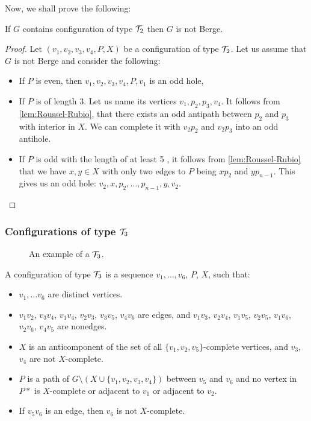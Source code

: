 Now, we shall prove the following:

\begin{theorem}
	If $G$ contains configuration of type $\mathcal{T}_2$ then $G$ is not Berge.
\end{theorem}
\begin{proof}
	Let $(v_1, v_2, v_3, v_4, P, X)$ be a configuration of type $\mathcal{T}_2$. Let us assume that $G$ is not Berge and consider the following:
	\begin{itemize}
		\item If $P$ is even, then $v_1, v_2, v_3, v_4, P, v_1$ is an odd hole,
		\item If $P$ is of length 3.  Let us name its vertices $v_1, p_2, p_3, v_4$. It follows from \cref{lem:Roussel-Rubio}, that there exists an odd antipath between $p_2$ and $p_3$ with interior in $X$. We can complete it with $v_2p_2$ and $v_2p_3$ into an odd antihole.
		\item If $P$ is odd with the length of at least 5 , it follows from \cref{lem:Roussel-Rubio} that we have $x, y \in X$ with only two edges to $P$ being $xp_2$ and $yp_{n-1}$. This gives us an odd hole: $v_2, x, p_2, \ldots, p_{n-1}, y, v_2$.
	\end{itemize}
\end{proof}

\subsubsection{Configurations of type $\mathcal{T}_3$}

\begin{wrapfigure}{r}{0.35\textwidth}
	
	\caption{An example of a $\mathcal{T}_3$.}%
	\vspace{-1.5cm}
\end{wrapfigure}

A configuration of type $\mathcal{T}_3$ is a sequence $v_1, \ldots, v_6$, $P$, $X$, such that:
\begin{itemize}
	\item $v_1, \ldots v_6$ are distinct vertices.
	\item $v_1v_2$, $v_3v_4$, $v_1v_4$, $v_2v_3$, $v_3v_5$, $v_4v_6$ are edges, and $v_1v_3$, $v_2v_4$, $v_1v_5$, $v_2v_5$, $v_1v_6$, $v_2v_6$, $v_4v_5$ are nonedges.
	\item $X$ is an anticomponent of the set of all $\{v_1, v_2, v_5\}$-complete vertices, and $v_3$, $v_4$ are not $X$-complete.
	\item $P$ is a path of $G \setminus ( X \cup \{v_1, v_2, v_3, v_4\} )$ between $v_5$ and $v_6$ and no vertex in $P*$ is $X$-complete or adjacent to $v_1$ or adjacent to $v_2$.
	\item If $v_5v_6$ is an edge, then $v_6$ is not $X$-complete.
\end{itemize}

